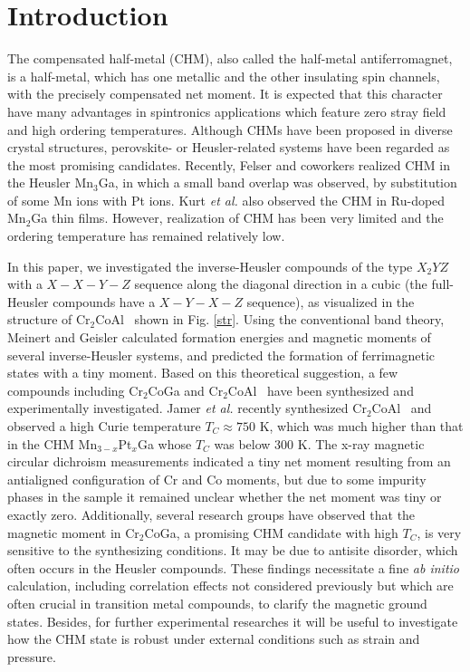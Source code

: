 \documentclass[preprint,5p]{elsarticle}
\newcommand{\cca}{Cr$_2$CoAl}
\begin{document}
\section{Introduction}
The compensated half-metal (CHM), also called the half-metal antiferromagnet,\cite{groot} 
is a half-metal, which has one metallic and the other insulating spin channels, 
with the precisely compensated net moment.
It is expected that this character have many advantages in spintronics applications 
which feature zero stray field and high ordering temperatures.
Although CHMs have been proposed in diverse crystal structures,\cite{nicro}
perovskite- or Heusler-related systems have been regarded
as the most promising candidates.
\cite{nicro,pickett,scoo,pdcro,ku12,felser1}
Recently, Felser and coworkers realized CHM in the Heusler Mn$_3$Ga, 
in which a small band overlap was observed,\cite{felser1} 
by substitution of some Mn ions with Pt ions.\cite{felser2}
Kurt {\it et al.} also observed the CHM in Ru-doped Mn$_2$Ga thin films.\cite{kurt}
However, realization of CHM has been very limited
and the ordering temperature has remained relatively low.

In this paper, we investigated the inverse-Heusler compounds of the type $X_2YZ$ 
with a $X-X-Y-Z$ sequence along the diagonal direction in a cubic
(the full-Heusler compounds have a $X-Y-X-Z$ sequence), 
as visualized in the structure of \cca~ shown in Fig. \ref{str}. 
Using the conventional band theory,
Meinert and Geisler calculated formation energies and magnetic moments of
several inverse-Heusler systems, 
and predicted the formation of ferrimagnetic states with a tiny moment.\cite{cca_the}
Based on this theoretical suggestion, 
a few compounds including Cr$_2$CoGa and \cca~
have been synthesized and experimentally investigated. 
Jamer {\it et al.} recently synthesized \cca~ and observed 
a high Curie temperature $T_C\approx750$ K,\cite{cca_exp}
which was much higher than that in the CHM Mn$_{3-x}$Pt$_x$Ga 
whose $T_C$ was below 300 K.\cite{felser2}
The x-ray magnetic circular dichroism measurements indicated
a tiny net moment resulting from an antialigned configuration of Cr and Co moments,
but due to some impurity phases in the sample
it remained unclear whether the net moment was tiny or exactly zero.
Additionally, several research groups have observed that the magnetic moment in Cr$_2$CoGa, 
a promising CHM candidate with high $T_C$, 
is very sensitive to the synthesizing conditions.\cite{hak13,feng15,deka16,jamer16}
It may be due to antisite disorder, which often occurs in the Heusler compounds.
These findings necessitate a fine {\it ab initio} calculation, 
including correlation effects not considered previously 
but which are often crucial in transition metal compounds,
to clarify the magnetic ground states.
Besides, for further experimental researches it will be useful to investigate 
how the CHM state is robust under external conditions such as strain and pressure.
\end{document}
